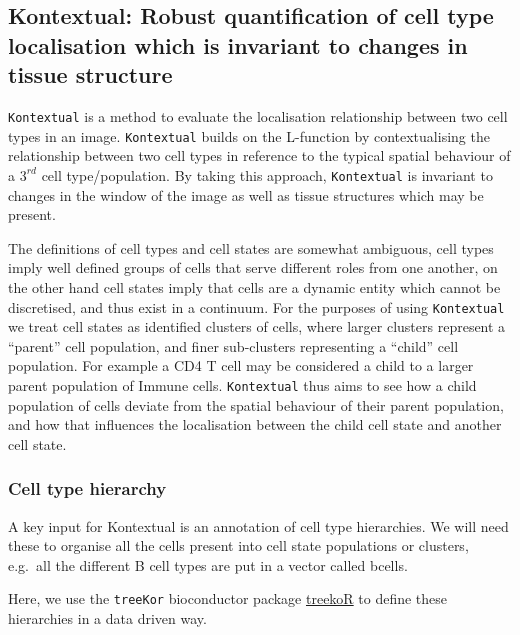 \documentclass[
  letterpaper,
  DIV=11,
  numbers=noendperiod]{scrreprt}
\begin{document}
\subsection{Kontextual: Robust quantification of cell type localisation
which is invariant to changes in tissue
structure}\label{kontextual-robust-quantification-of-cell-type-localisation-which-is-invariant-to-changes-in-tissue-structure}

\texttt{Kontextual} is a method to evaluate the localisation
relationship between two cell types in an image. \texttt{Kontextual}
builds on the L-function by contextualising the relationship between two
cell types in reference to the typical spatial behaviour of a \(3^{rd}\)
cell type/population. By taking this approach, \texttt{Kontextual} is
invariant to changes in the window of the image as well as tissue
structures which may be present.

The definitions of cell types and cell states are somewhat ambiguous,
cell types imply well defined groups of cells that serve different roles
from one another, on the other hand cell states imply that cells are a
dynamic entity which cannot be discretised, and thus exist in a
continuum. For the purposes of using \texttt{Kontextual} we treat cell
states as identified clusters of cells, where larger clusters represent
a ``parent'' cell population, and finer sub-clusters representing a
``child'' cell population. For example a CD4 T cell may be considered a
child to a larger parent population of Immune cells. \texttt{Kontextual}
thus aims to see how a child population of cells deviate from the
spatial behaviour of their parent population, and how that influences
the localisation between the child cell state and another cell state.

\subsubsection{Cell type hierarchy}\label{cell-type-hierarchy}

A key input for Kontextual is an annotation of cell type hierarchies. We
will need these to organise all the cells present into cell state
populations or clusters, e.g.~all the different B cell types are put in
a vector called bcells.

Here, we use the \texttt{treeKor} bioconductor package
\href{http://www.bioconductor.org/packages/release/bioc/html/treekoR.html}{treekoR}
to define these hierarchies in a data driven way.
\end{document}

